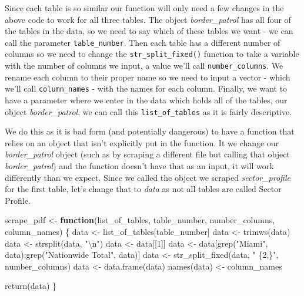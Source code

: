 \documentclass[
]{krantz}
\makeatletter
\newenvironment{Shaded}{\begin{snugshade}}{\end{snugshade}}
\newcommand{\ControlFlowTok}[1]{\textcolor[rgb]{0.27,0.27,0.27}{\textbf{#1}}}
\newcommand{\DecValTok}[1]{\textcolor[rgb]{0.06,0.06,0.06}{#1}}
\newcommand{\FunctionTok}[1]{\textcolor[rgb]{0,0,0}{#1}}
\newcommand{\NormalTok}[1]{#1}
\newcommand{\OtherTok}[1]{\textcolor[rgb]{0.37,0.37,0.37}{#1}}
\newcommand{\SpecialCharTok}[1]{\textcolor[rgb]{0,0,0}{#1}}
\newcommand{\StringTok}[1]{\textcolor[rgb]{0.5,0.5,0.5}{#1}}
\newenvironment{kframe}{%
\medskip{}
\setlength{\fboxsep}{.8em}
 \def\at@end@of@kframe{}%
 \ifinner\ifhmode%
  \def\at@end@of@kframe{\end{minipage}}%
  \begin{minipage}{\columnwidth}%
 \fi\fi%
 \def\FrameCommand##1{\hskip\@totalleftmargin \hskip-\fboxsep
 \colorbox{shadecolor}{##1}\hskip-\fboxsep
     \hskip-\linewidth \hskip-\@totalleftmargin \hskip\columnwidth}%
 \MakeFramed {\advance\hsize-\width
   \@totalleftmargin\z@ \linewidth\hsize
   \@setminipage}}%
 {\par\unskip\endMakeFramed%
 \at@end@of@kframe}
\renewenvironment{Shaded}{\begin{kframe}}{\end{kframe}}
\makeatother
\begin{document}
Since each table is so similar our function will only need a few changes in the above code to work for all three tables. The object \emph{border\_patrol} has all four of the tables in the data, so we need to say which of these tables we want - we can call the parameter \texttt{table\_number}. Then each table has a different number of columns so we need to change the \texttt{str\_split\_fixed()} function to take a variable with the number of columns we input, a value we'll call \texttt{number\_columns}. We rename each column to their proper name so we need to input a vector - which we'll call \texttt{column\_names} - with the names for each column. Finally, we want to have a parameter where we enter in the data which holds all of the tables, our object \emph{border\_patrol}, we can call this \texttt{list\_of\_tables} as it is fairly descriptive.

We do this as it is bad form (and potentially dangerous) to have a function that relies on an object that isn't explicitly put in the function. It we change our \emph{border\_patrol} object (such as by scraping a different file but calling that object \emph{border\_patrol}) and the function doesn't have that as an input, it will work differently than we expect. Since we called the object we scraped \emph{sector\_profile} for the first table, let's change that to \emph{data} as not all tables are called Sector Profile.

\begin{Shaded}
\begin{Highlighting}[]
\NormalTok{scrape\_pdf }\OtherTok{\textless{}{-}} \ControlFlowTok{function}\NormalTok{(list\_of\_tables, table\_number, number\_columns, column\_names) \{}
\NormalTok{  data }\OtherTok{\textless{}{-}}\NormalTok{ list\_of\_tables[table\_number]}
\NormalTok{  data }\OtherTok{\textless{}{-}} \FunctionTok{trimws}\NormalTok{(data)}
\NormalTok{  data }\OtherTok{\textless{}{-}} \FunctionTok{strsplit}\NormalTok{(data, }\StringTok{"}\SpecialCharTok{\textbackslash{}n}\StringTok{"}\NormalTok{)}
\NormalTok{  data }\OtherTok{\textless{}{-}}\NormalTok{ data[[}\DecValTok{1}\NormalTok{]]}
\NormalTok{  data }\OtherTok{\textless{}{-}}\NormalTok{ data[}\FunctionTok{grep}\NormalTok{(}\StringTok{"Miami"}\NormalTok{, data)}\SpecialCharTok{:}\FunctionTok{grep}\NormalTok{(}\StringTok{"Nationwide Total"}\NormalTok{, data)]}
\NormalTok{  data }\OtherTok{\textless{}{-}} \FunctionTok{str\_split\_fixed}\NormalTok{(data, }\StringTok{" \{2,\}"}\NormalTok{, number\_columns)}
\NormalTok{  data }\OtherTok{\textless{}{-}} \FunctionTok{data.frame}\NormalTok{(data)}
  \FunctionTok{names}\NormalTok{(data) }\OtherTok{\textless{}{-}}\NormalTok{ column\_names}
  
  \FunctionTok{return}\NormalTok{(data)}
\NormalTok{\}}
\end{Highlighting}
\end{Shaded}
\end{document}
